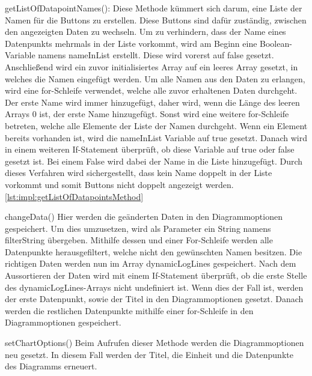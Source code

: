 \begin{compactitem}
    \item getListOfDatapointNames(): Diese Methode kümmert sich darum, eine Liste der Namen für die Buttons zu erstellen. Diese Buttons sind dafür zuständig, zwischen den angezeigten Daten zu wechseln.
    Um zu verhindern, dass der Name eines Datenpunkts mehrmals in der Liste vorkommt, wird am Beginn eine Boolean-Variable namens nameInList erstellt. Diese wird vorerst auf false gesetzt.
    Anschließend wird ein zuvor initialisiertes Array auf ein leeres Array gesetzt, in welches die Namen eingefügt werden. Um alle Namen aus den Daten zu erlangen, wird eine for-Schleife verwendet, welche alle zuvor erhaltenen Daten durchgeht. Der erste Name wird immer hinzugefügt, daher wird, wenn die Länge des leeren Arrays 0 ist, der erste Name hinzugefügt. Sonst wird eine weitere for-Schleife betreten, welche alle Elemente der Liste der Namen durchgeht. Wenn ein Element bereits vorhanden ist, wird die nameInList Variable auf true gesetzt. Danach wird in einem weiteren If-Statement überprüft, ob diese Variable auf true oder false gesetzt ist. Bei einem False wird dabei der Name in die Liste hinzugefügt. Durch dieses Verfahren wird sichergestellt, dass kein Name doppelt in der Liste vorkommt und somit Buttons nicht doppelt angezeigt werden. \ref{lst:impl:getListOfDatapointsMethod}   
    \item changeData()
    Hier werden die geänderten Daten in den Diagrammoptionen gespeichert. Um dies umzusetzen, wird als Parameter ein String namens filterString übergeben. Mithilfe dessen und einer For-Schleife werden alle Datenpunkte herausgefiltert, welche nicht den gewünschten Namen besitzen. Die richtigen Daten werden nun im Array dynamicLogLines gespeichert. Nach dem Aussortieren der Daten wird mit einem If-Statement überprüft, ob die erste Stelle des dynamicLogLines-Arrays nicht undefiniert ist. Wenn dies der Fall ist, werden der erste Datenpunkt, sowie der Titel in den Diagrammoptionen gesetzt. Danach werden die restlichen Datenpunkte mithilfe einer for-Schleife in den Diagrammoptionen gespeichert.               
    \item setChartOptions()
    Beim Aufrufen dieser Methode werden die Diagrammoptionen neu gesetzt. In diesem Fall werden der Titel, die Einheit und die Datenpunkte des Diagramms erneuert.       
\end{compactitem}



